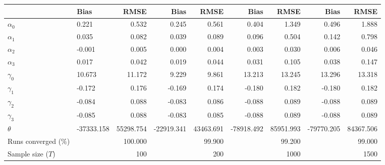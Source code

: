 
\begin{tabular}[t]{llrrrrrrr}
\toprule
  & Bias & RMSE & Bias & RMSE & Bias & RMSE & Bias & RMSE\\
\midrule
$\alpha_{0}$ & 0.221 & 0.532 & 0.245 & 0.561 & 0.404 & 1.349 & 0.496 & 1.888\\
$\alpha_{1}$ & 0.035 & 0.082 & 0.039 & 0.089 & 0.096 & 0.504 & 0.142 & 0.798\\
$\alpha_{2}$ & -0.001 & 0.005 & 0.000 & 0.004 & 0.003 & 0.030 & 0.006 & 0.046\\
$\alpha_{3}$ & 0.017 & 0.042 & 0.019 & 0.044 & 0.031 & 0.105 & 0.038 & 0.147\\
$\gamma_{0}$ & 10.673 & 11.172 & 9.229 & 9.861 & 13.213 & 13.245 & 13.296 & 13.318\\
$\gamma_{1}$ & -0.172 & 0.176 & -0.169 & 0.174 & -0.180 & 0.182 & -0.180 & 0.182\\
$\gamma_{2}$ & -0.084 & 0.088 & -0.083 & 0.086 & -0.088 & 0.089 & -0.088 & 0.089\\
$\gamma_{3}$ & -0.085 & 0.088 & -0.083 & 0.085 & -0.088 & 0.089 & -0.088 & 0.089\\
$\theta$ & -37333.158 & 55298.754 & -22919.341 & 43463.691 & -78918.492 & 85951.993 & -79770.205 & 84367.506\\
Runs converged (\%) &  & 100.000 &  & 99.900 &  & 99.200 &  & 99.000\\
Sample size ($T$) &  & 100 &  & 200 &  & 1000 &  & 1500\\
\bottomrule
\end{tabular}
